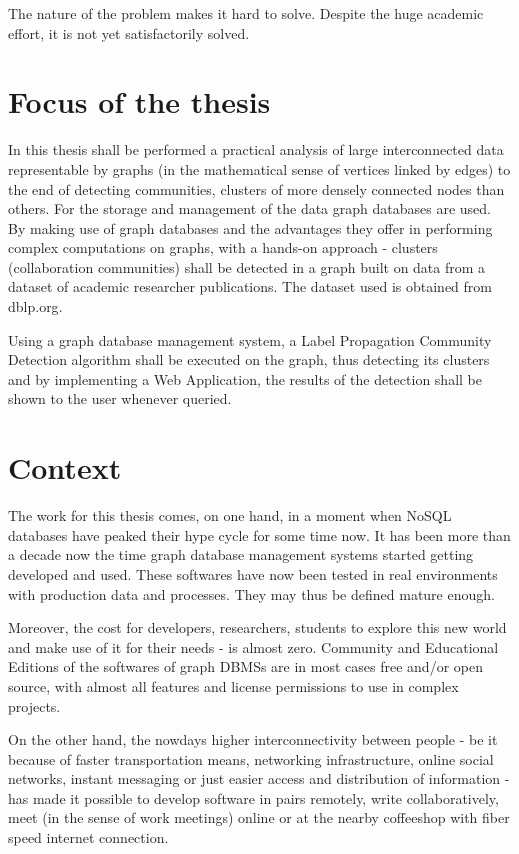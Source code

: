 The nature of the problem makes it hard to solve.
Despite the huge academic effort, it is not yet satisfactorily solved.

\section{Focus of the thesis} \label{section:Introduction/Focusofthethesis}
In this thesis shall be performed a practical analysis of large interconnected data representable by graphs (in the mathematical sense of vertices linked by edges) to the end of detecting communities, clusters of more densely connected nodes than others.
For the storage and management of the data \Glspl{graph database} are used.
By making use of \Glspl{graph database} and the advantages they offer in performing complex computations on graphs, with a hands-on approach - clusters (collaboration communities) shall be detected in a graph built on data from a dataset of academic researcher publications.
The dataset used is obtained from \gls{dblp.org}.

Using a graph database management system, a Label Propagation Community Detection algorithm shall be executed on the graph, thus detecting its clusters and by implementing a \gls{Web Application}, the results of the detection shall be shown to the user whenever queried.

\section{Context} \label{section:Introduction/Context}
The work for this thesis comes, on one hand, in a moment when NoSQL databases have peaked their hype cycle for some time now.
It has been more than a decade now the time graph database management systems started getting developed and used.
These softwares have now been tested in real environments with production data and processes.
They may thus be defined mature enough.

Moreover, the cost for developers, researchers, students to explore this new world and make use of it for their needs - is almost zero.
Community and Educational Editions of the softwares of graph DBMSs are in most cases free and/or open source, with almost all features and license permissions to use in complex projects.

On the other hand, the nowdays higher interconnectivity between people - be it because of faster transportation means, networking infrastructure, online social networks, instant messaging or just easier access and distribution of information - has made it possible to develop software in pairs remotely, write collaboratively, meet (in the sense of work meetings) online or at the nearby coffeeshop with fiber speed internet connection.

